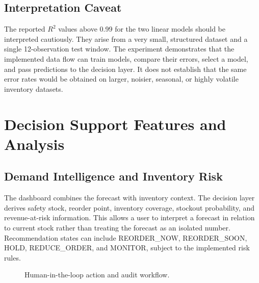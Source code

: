 \documentclass[9pt,conference]{IEEEtran}
\providecommand{\syscite}[1]{}
\begin{document}
\subsection{Interpretation Caveat}
The reported $R^{2}$ values above 0.99 for the two linear models should be interpreted cautiously. \syscite{[cite: 1]} They arise from a very small, structured dataset and a single 12-observation test window. \syscite{[cite: 1]} The experiment demonstrates that the implemented data flow can train models, compare their errors, select a model, and pass predictions to the decision layer. \syscite{[cite: 1]} It does not establish that the same error rates would be obtained on larger, noisier, seasonal, or highly volatile inventory datasets. \syscite{[cite: 1]}

\section{Decision Support Features and Analysis}

\subsection{Demand Intelligence and Inventory Risk}
The dashboard combines the forecast with inventory context. \syscite{[cite: 1]} The decision layer derives safety stock, reorder point, inventory coverage, stockout probability, and revenue-at-risk information. \syscite{[cite: 1]} This allows a user to interpret a forecast in relation to current stock rather than treating the forecast as an isolated number. \syscite{[cite: 1]} Recommendation states can include REORDER\_NOW, REORDER\_SOON, HOLD, REDUCE\_ORDER, and MONITOR, subject to the implemented risk rules. \syscite{[cite: 1]}

\begin{figure}[htbp]
\centering
{}
\caption{Human-in-the-loop action and audit workflow.}
\label{fig:audit}
\end{figure}
\end{document}
